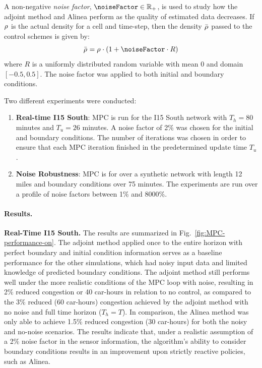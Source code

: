 A non-negative\emph{ noise factor}, $\noiseFactor \in \R_+$, is used to study how the adjoint
method and Alinea perform as the quality of estimated data decreases. If $\rho_{}^{}$ is the actual density for a cell and time-step, then the density $\bar{\rho_{}^{}}$ passed to the control schemes is given by:
\[
\bar{\discrete{}{}}=\discrete{}{}\cdot \left(1+\noiseFactor\cdot R\right)
\]
where $R$ is a uniformly distributed random variable with mean $0$
and domain $\left[-0.5,0.5\right]$. The noise factor was applied
to both initial and boundary conditions.
								
Two different experiments were conducted:
\begin{enumerate}
	\item \textbf{Real-time I15 South}: MPC is run for the I15 South network
	with $T_{h}=80$ minutes and $T_{u}=26$ minutes. A noise factor of
	2\% was chosen for the initial and boundary conditions. The number
	of iterations was chosen in order to ensure that each MPC iteration
	finished in the predetermined update time $T_{u}$.
	\item \textbf{Noise Robustness}: MPC is for over a synthetic network with
	length 12 miles and boundary conditions over 75 minutes. The experiments
	are run over a profile of noise factors between 1\% and 8000\%.
\end{enumerate}
								
\paragraph{Results.}
								
\textbf{Real-Time I15 South.} The results are summarized in Fig.~\ref{fig:MPC-performance-on}.
The adjoint method applied once to the entire horizon with perfect
boundary and initial condition information serves as a baseline performance
for the other simulations, which had noisy input data and limited
knowledge of predicted boundary conditions. The adjoint method still
performs well under the more realistic conditions of the MPC loop
with noise, resulting in 2\% reduced congestion or 40 car-hours in relation to no control, as compared to the 3\% reduced (60 car-hours) congestion achieved by the adjoint method with no noise and full time horizon ($T_h=T$). In comparison, the Alinea method was only able to achieve 1.5\% reduced congestion (30 car-hours) for both the noisy and no-noise scenarios. The results indicate
that, under a realistic assumption of a 2\% noise factor in the sensor
information, the algorithm's ability to consider boundary conditions results in an improvement upon strictly reactive policies,
such as Alinea.
								
